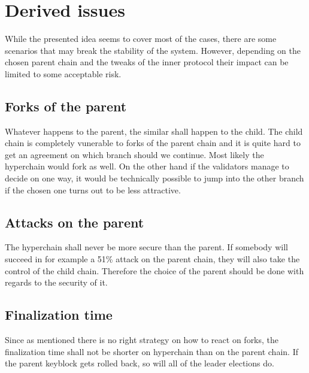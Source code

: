 \section{Derived issues}

While the presented idea seems to cover most of the cases, there are some
scenarios that may break the stability of the system. However, depending on the
chosen parent chain and the tweaks of the inner protocol their impact can be
limited to some acceptable risk.

\subsection{Forks of the parent}
Whatever happens to the parent, the similar shall happen to the child. The child
chain is completely vunerable to forks of the parent chain and it is quite hard
to get an agreement on which branch should we continue. Most likely the
hyperchain would fork as well. On the other hand if the validators manage to
decide on one way, it would be technically possible to jump into the other
branch if the chosen one turns out to be less attractive.

\subsection{Attacks on the parent}

The hyperchain shall never be more secure than the parent. If somebody will
succeed in for example a 51\% attack on the parent chain, they will also take
the control of the child chain. Therefore the choice of the parent should be
done with regards to the security of it.

\subsection{Finalization time}

Since as mentioned there is no right strategy on how to react on forks, the
finalization time shall not be shorter on hyperchain than on the parent chain.
If the parent keyblock gets rolled back, so will all of the leader elections do.